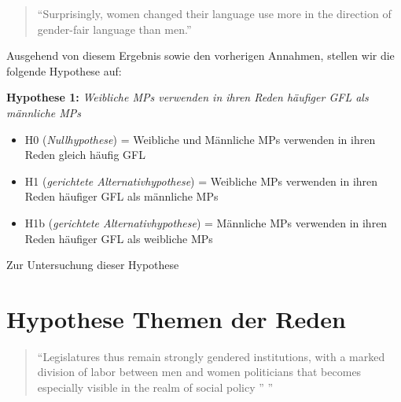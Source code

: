 \documentclass[12pt, 
    twoside=false, 
    bibliography=totoc, 
    numbers=endperiod, 
    headings=normal, 
    toc=chapterentrydotfill
    ]{scrbook}
\begin{document}
\citereset
\begin{quote}
    \enquote {Surprisingly, women changed their language use more in the direction of gender-fair language than men.} \parencite[555]{koeser_2014}
\end{quote}


Ausgehend von diesem Ergebnis sowie den vorherigen Annahmen, stellen wir die folgende Hypothese auf: 

\textbf{Hypothese 1:} \emph{Weibliche MPs verwenden in ihren Reden häufiger GFL als männliche MPs}

\begin{itemize}
    \item H0 (\emph{Nullhypothese}) = Weibliche und Männliche MPs verwenden in ihren Reden gleich häufig GFL 
    \item H1 (\emph{gerichtete Alternativhypothese}) = Weibliche MPs verwenden in ihren Reden häufiger GFL als männliche MPs
    \item H1b (\emph{gerichtete Alternativhypothese}) = Männliche MPs verwenden in ihren Reden häufiger GFL als weibliche MPs
\end{itemize}{}

Zur Untersuchung dieser Hypothese 



\section{Hypothese Themen der Reden}\label{kapitel:hypothese2}

\begin{quote}
    \enquote{Legislatures thus remain strongly gendered institutions, with a marked division of labor between men and women politicians that becomes especially visible in the realm of social policy ” \parencite[250]{ennser-jedenastik_2017}}
\end{quote}
\end{document}

